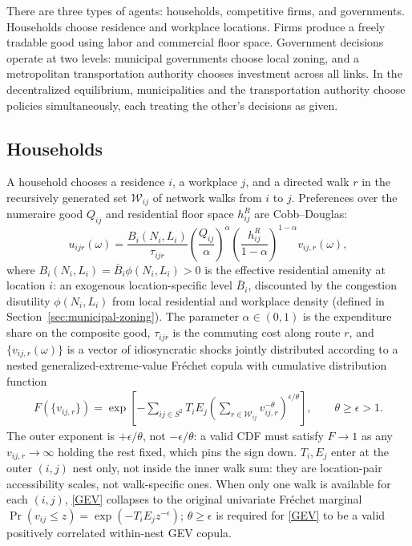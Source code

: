 \documentclass[12pt, a4paper]{article}
\theoremstyle{definition}
\theoremstyle{remark}
\begin{document}
There are three types of agents: households, competitive firms, and governments. Households choose residence and workplace locations. Firms produce a freely tradable good using labor and commercial floor space. Government decisions operate at two levels: municipal governments choose local zoning, and a metropolitan transportation authority chooses investment across all links. In the decentralized equilibrium, municipalities and the transportation authority choose policies simultaneously, each treating the other's decisions as given.

\subsection{Households}
\label{sec:households}

A household chooses a residence $i$, a workplace $j$, and a directed walk $r$ in the recursively generated set $\mathcal W_{ij}$ of network walks from $i$ to $j$. Preferences over the numeraire good $Q_{ij}$ and residential floor space $h_{ij}^R$ are Cobb--Douglas:
\[
u_{ijr}(\omega) = \frac{B_i(N_i,L_i)}{\tau_{ijr}}
\left(\frac{Q_{ij}}{\alpha}\right)^{\!\alpha}
\left(\frac{h_{ij}^R}{1-\alpha}\right)^{\!1-\alpha}
v_{ij,r}(\omega),
\]
where $B_i(N_i,L_i) = \bar B_i \phi(N_i,L_i) > 0$ is the effective residential amenity at location $i$: an exogenous location-specific level $\bar B_i$, discounted by the congestion disutility $\phi(N_i,L_i)$ from local residential and workplace density (defined in Section~\ref{sec:municipal-zoning}). The parameter $\alpha \in (0,1)$ is the expenditure share on the composite good, $\tau_{ijr}$ is the commuting cost along route $r$, and $\{v_{ij,r}(\omega)\}$ is a vector of idiosyncratic shocks jointly distributed according to a nested generalized-extreme-value Fréchet copula with cumulative distribution function
\begin{align}
    \label{GEV}
    F(\{v_{ij,r}\}) = \exp\!\left[-\sum_{ij \in S^{2}} T_iE_j\left(\sum_{r\in \mathcal W_{ij}}v_{ij,r}^{-\theta}\right)^{\!\epsilon/\theta}\right], \qquad \theta \geq \epsilon > 1.
\end{align}
The outer exponent is $+\epsilon/\theta$, not $-\epsilon/\theta$: a valid CDF must satisfy $F\to1$ as any $v_{ij,r}\to\infty$ holding the rest fixed, which pins the sign down. $T_i,E_j$ enter at the outer $(i,j)$ nest only, not inside the inner walk sum: they are location-pair accessibility scales, not walk-specific ones. When only one walk is available for each $(i,j)$, \eqref{GEV} collapses to the original univariate Fréchet marginal $\Pr(v_{ij}\leq z)=\exp(-T_iE_jz^{-\epsilon})$; $\theta\geq\epsilon$ is required for \eqref{GEV} to be a valid positively correlated within-nest GEV copula.
\end{document}
